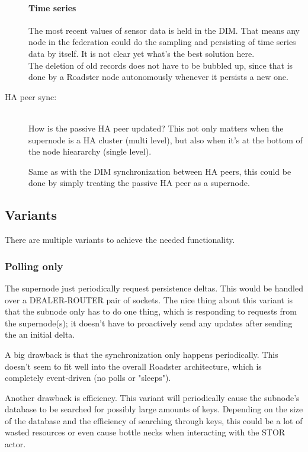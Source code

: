 \begin{description}
		\paragraph{Time series} The most recent values of sensor data
		is held in the DIM. That means any node in the federation could
		do the sampling and persisting of time series data by itself.
		{\color{red}It is not clear yet what's the best solution here.}\\
		The deletion of old records does not have to be bubbled up,
		since that is done by a Roadster node autonomously whenever it
		persists a new one.

	\item [HA peer sync:]\hfill\\
		How is the passive HA peer updated?
		This not only matters when the supernode is a HA cluster (multi
		level), but also when it's at the bottom of the node hieararchy
		(single level).

		Same as with the DIM synchronization between HA peers, this
		could be done by simply treating the passive HA peer as a
		supernode.
\end{description}


\subsection{Variants}
There are multiple variants to achieve the needed functionality.

\subsubsection{Polling only}
The supernode just periodically request persistence
deltas. This would be handled over a DEALER-ROUTER pair of sockets. The nice
thing about this variant is that the subnode only has to do one thing, which is
responding to requests from the supernode(s); it doesn't have to proactively
send any updates after sending the an initial delta.

A big drawback is that the synchronization only happens periodically. This
doesn't seem to fit well into the overall Roadster architecture, which is
completely event-driven (no polls or "sleeps").

Another drawback is efficiency. This variant will periodically cause the
subnode's database to be searched for possibly large amounts of keys. Depending on the size of the
database and the efficiency of searching through keys, this could be a lot of
wasted resources or even cause bottle necks when interacting with the STOR
actor.

